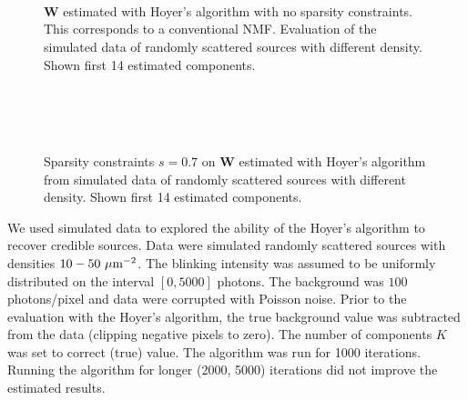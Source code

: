 \begin{figure}[!htb] %
	\newcommand{\sizefig}{.9}
	\centering
	\\
	\\
	\\	
	\caption{$\bm{W}$ estimated with Hoyer's algorithm with no sparsity constraints. This corresponds to a conventional NMF. Evaluation of the simulated data of randomly scattered sources with different density. Shown first 14 estimated components.}
	\label{fig: Hoyer no sparsity constraint}
\end{figure}

\begin{figure}[htbp!] %
	\newcommand{\sizefig}{.9}
	\centering
	\\
	\\
	\\	
	\caption{Sparsity constraints $s=0.7$ on $\bm{W}$ estimated with Hoyer's algorithm from simulated data of randomly scattered sources with different density. Shown first 14 estimated components.}
	\label{fig: Hoyer sparsity 0.7}
\end{figure}

We used simulated data to explored the ability of the Hoyer's algorithm to recover credible sources. Data were simulated randomly scattered sources with densities $10-50\,\, \mathrm{\mu m}^{-2}$. The blinking intensity  was assumed to be uniformly distributed on the interval $[0, 5000]$ photons. The background was $100$ photons/pixel and data were corrupted with Poisson noise. Prior to the evaluation with the Hoyer's algorithm, the true background value was subtracted from the data (clipping negative pixels to zero). The number of components $K$ was set to correct (true) value. The algorithm was run for 1000 iterations. Running the algorithm for longer (2000, 5000) iterations did not improve the estimated results. 

